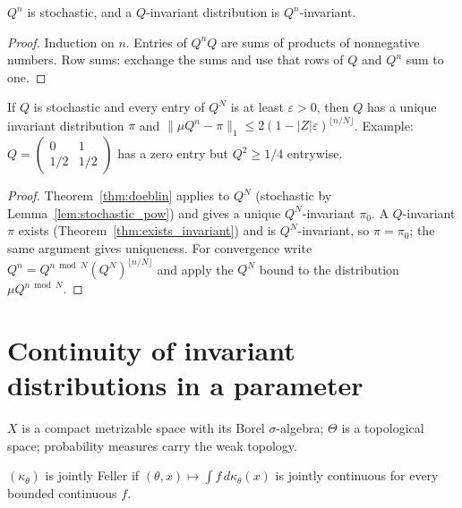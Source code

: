 \begin{lemma}
\label{lem:stochastic_pow}
\leanok
{}
$Q^n$ is stochastic, and a $Q$-invariant distribution is $Q^n$-invariant.
\end{lemma}
\begin{proof}
\leanok
Induction on $n$. Entries of $Q^{n}Q$ are sums of products of nonnegative numbers. Row sums:
exchange the sums and use that rows of $Q$ and $Q^n$ sum to one.
\end{proof}

\begin{theorem}
\label{thm:doeblin_pow}
\leanok
{}
If $Q$ is stochastic and every entry of $Q^N$ is at least $\varepsilon>0$, then $Q$ has a unique invariant
distribution $\pi$ and $\|\mu Q^n - \pi\|_1 \le 2(1 - |Z|\varepsilon)^{\lfloor n/N\rfloor}$. Example: $Q =
\begin{pmatrix}0&1\\1/2&1/2\end{pmatrix}$ has a zero entry but $Q^2 \ge 1/4$ entrywise.
\end{theorem}
\begin{proof}
\leanok
{}
Theorem~\ref{thm:doeblin} applies to $Q^N$ (stochastic by Lemma~\ref{lem:stochastic_pow}) and gives a unique
$Q^N$-invariant $\pi_0$. A $Q$-invariant $\pi$ exists (Theorem~\ref{thm:exists_invariant}) and is
$Q^N$-invariant, so $\pi = \pi_0$; the same argument gives uniqueness. For convergence write
$Q^n = Q^{n \bmod N}(Q^N)^{\lfloor n/N\rfloor}$ and apply the $Q^N$ bound to the distribution $\mu Q^{n\bmod N}$.
\end{proof}

\section{Continuity of invariant distributions in a parameter}
\label{sec:param_invariant}

$X$ is a compact metrizable space with its Borel $\sigma$-algebra; $\Theta$ is a topological space;
probability measures carry the weak topology.

\begin{definition}
\label{def:jointly_feller}
\leanok
{}
$(\kappa_\theta)$ is jointly Feller if $(\theta,x) \mapsto \int f\,d\kappa_\theta(x)$ is jointly continuous for every
bounded continuous $f$.
\end{definition}

